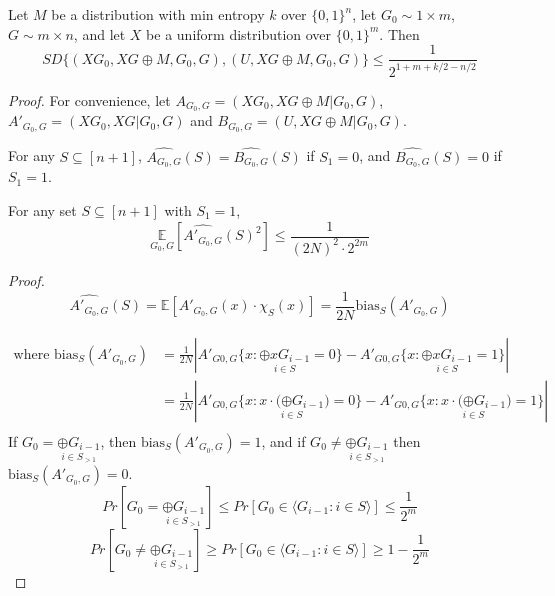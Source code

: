 \begin{theorem}
Let $M$ be a distribution with min entropy $k$ over $\{0 , 1 \}^n$, let $G_0 \sim 1 \times m$, $G \sim m \times n$, and let $X$ be a uniform distribution over $\{ 0, 1 \} ^ m$. Then 
$$SD \{ (XG_0, XG \oplus M, G_0, G), (U, XG \oplus M, G_0, G) \} \leq 
\frac{1}{2^{1+m+k/2 - n/2}}$$
\end{theorem}

\begin{proof}
For convenience, let $A_{G_0, G} = (XG_0, XG \oplus M | G_0 , G)$, 
$A'_{G_0,G} = (XG_0, XG | G_0 , G) $ and
$B_{G_0,G} = (U, XG \oplus M | G_0 , G)$.

\begin{claim}
For any $S \subseteq [n+1]$, $\widehat{A_{G_0,G}}(S) = \widehat{B_{G_0,G}}(S)$ if $S_1 = 0$, and 
$\widehat{B_{G_0,G}}(S) = 0$ if $S_1 = 1$.
\end{claim} 

\begin{claim}
For any set $S \subseteq [n+1]$ with $S_1 =1$, 
$$\underset{G_0, G} {\mathbb{E}} 
	[\widehat{A'_{G_0,G}}(S)^2] \leq \frac{1}{(2N)^2 \cdot 2^{2m}} $$
\end{claim}

\noindent \textit{Proof.}
$$ \widehat{A'_{G_0,G}}(S) = \mathbb{E}[A'_{G_0,G}(x) \cdot \chi_S(x)]
= \frac{1}{2N} \text{bias}_S(A'_{G_0, G})$$

\begin{align*}
\text{where }
\text{bias}_S(A'_{G_0, G})
&= \frac{1}{2N} \left| 
	A'_{G0,G} \{ x : \underset{i \in S} {\oplus xG_{i-1}} = 0 \} - 
	A'_{G0,G} \{ x : \underset{i \in S} {\oplus xG_{i-1}} = 1 \} 
	\right| \\
&= \frac{1}{2N} \left| 
	A'_{G0,G} \{ x : \underset{i \in S} {x \cdot (\oplus G_{i-1}}) = 0 \} - 
	A'_{G0,G} \{ x : \underset{i \in S} {x \cdot (\oplus G_{i-1}}) = 1 \} 
	\right| \\
\end{align*}
If $G_0 = \underset{i \in S_{>1}} {\oplus G_{i-1}}$, then $\text{bias}_S (A'_{G_0, G}) = 1$, and if $G_0 \neq  \underset{i \in S_{>1}} {\oplus G_{i-1}}$ then $\text{bias}_S (A'_{G_0, G}) = 0$. \\
$$Pr[G_0 =  \underset{i \in S_{>1}} {\oplus G_{i-1}}]  
\leq Pr[G_0 \in {\langle G_{i-1} : i \in S \rangle}] \leq \frac{1}{2^m}$$
$$Pr[G_0 \neq  \underset{i \in S_{>1}} {\oplus G_{i-1}}]  
\geq Pr[G_0 \in {\langle G_{i-1} : i \in S \rangle}] \geq 1 - \frac{1}{2^m}$$


\end{proof}
